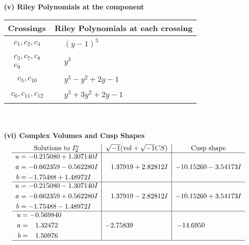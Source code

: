 \documentclass[1p]{elsarticle_modified}
\theoremstyle{definition}
\newcommand{\I}{\sqrt{-1}}
\begin{document}
\newpage\renewcommand{\arraystretch}{1}
\flushleft \textbf{(v) Riley Polynomials at the component}\newline \\
\begin{tabular}{m{50pt}|m{274pt}}
Crossings & \hspace{64pt}Riley Polynomials at each crossing \\
\hline $$\begin{aligned}c_{1},c_{2},c_{4}\end{aligned}$$&$\begin{aligned}
&(y-1)^3
\end{aligned}$\\
\hline $$\begin{aligned}c_{3},c_{7},c_{8}\\c_{9}\end{aligned}$$&$\begin{aligned}
&y^3
\end{aligned}$\\
\hline $$\begin{aligned}c_{5},c_{10}\end{aligned}$$&$\begin{aligned}
&y^3- y^2+2 y-1
\end{aligned}$\\
\hline $$\begin{aligned}c_{6},c_{11},c_{12}\end{aligned}$$&$\begin{aligned}
&y^3+3 y^2+2 y-1
\end{aligned}$\\
\hline
\end{tabular}\\~\\
\newpage\flushleft \textbf{(vi) Complex Volumes and Cusp Shapes}
$$\begin{array}{c|c|c}  
\text{Solutions to }I^u_{2}& \I (\text{vol} + \sqrt{-1}CS) & \text{Cusp shape}\\
 \hline 
\begin{aligned}
u &= -0.215080 + 1.307140 I \\
a &= -0.662359 - 0.562280 I \\
b &= -1.75488 + 1.48972 I\end{aligned}
 & \phantom{-}1.37919 + 2.82812 I & -10.15260 - 3.54173 I \\ \hline\begin{aligned}
u &= -0.215080 - 1.307140 I \\
a &= -0.662359 + 0.562280 I \\
b &= -1.75488 - 1.48972 I\end{aligned}
 & \phantom{-}1.37919 - 2.82812 I & -10.15260 + 3.54173 I \\ \hline\begin{aligned}
u &= -0.569840\phantom{ +0.000000I} \\
a &= \phantom{-}1.32472\phantom{ +0.000000I} \\
b &= \phantom{-}1.50976\phantom{ +0.000000I}\end{aligned}
 & -2.75839\phantom{ +0.000000I} & -14.6950\phantom{ +0.000000I}\\
 \hline 
 \end{array}$$\newpage
\end{document}
